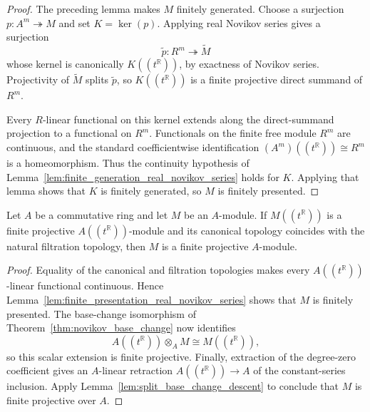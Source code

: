 \begin{proof}
  \leanok
  The preceding lemma makes $M$ finitely generated.  Choose a surjection
  $p\colon A^m\twoheadrightarrow M$ and set $K=\ker(p)$.  Applying real
  Novikov series gives a surjection
  \[
    \widetilde p\colon R^m\twoheadrightarrow\widetilde M
  \]
  whose kernel is canonically $K((t^{\mathbb{R}}))$, by exactness of Novikov
  series.  Projectivity of $\widetilde M$ splits $\widetilde p$, so
  $K((t^{\mathbb{R}}))$ is a finite projective direct summand of $R^m$.

  Every $R$-linear functional on this kernel extends along the direct-summand
  projection to a functional on $R^m$.  Functionals on the finite free module
  $R^m$ are continuous, and the standard coefficientwise identification
  $(A^m)((t^{\mathbb{R}}))\cong R^m$ is a homeomorphism.  Thus the continuity
  hypothesis of
  Lemma~\ref{lem:finite_generation_real_novikov_series} holds for $K$.
  Applying that lemma shows that $K$ is finitely generated, so $M$ is finitely
  presented.
\end{proof}

\begin{theorem}
  \label{thm:projective_novikov_series}
  \leanok
  Let $A$ be a commutative ring and let $M$ be an $A$-module. If
  $M((t^{\mathbb{R}}))$ is a finite projective
  $A((t^{\mathbb{R}}))$-module and its canonical topology coincides with the
  natural filtration topology, then $M$ is a finite projective $A$-module.
\end{theorem}

\begin{proof}
  \leanok
  Equality of the canonical and filtration topologies makes every
  $A((t^{\mathbb{R}}))$-linear functional continuous.  Hence
  Lemma~\ref{lem:finite_presentation_real_novikov_series} shows that $M$ is
  finitely presented.  The base-change isomorphism of
  Theorem~\ref{thm:novikov_base_change} now identifies
  \[
    A((t^{\mathbb{R}}))\otimes_A M\cong M((t^{\mathbb{R}})),
  \]
  so this scalar extension is finite projective.  Finally, extraction of the
  degree-zero coefficient gives an $A$-linear retraction
  $A((t^{\mathbb{R}}))\to A$ of the constant-series inclusion.  Apply
  Lemma~\ref{lem:split_base_change_descent} to conclude that $M$ is finite
  projective over $A$.
\end{proof}
